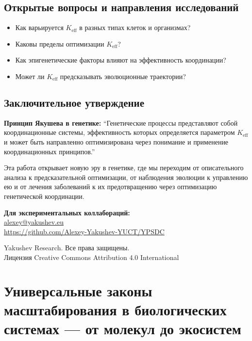 \documentclass[12pt]{article}
\begin{document}
	\subsection{Открытые вопросы и направления исследований}
	
	\begin{itemize}
		\item Как варьируется $K_{\text{eff}}$ в разных типах клеток и организмах?
		\item Каковы пределы оптимизации $K_{\text{eff}}$?
		\item Как эпигенетические факторы влияют на эффективность координации?
		\item Может ли $K_{\text{eff}}$ предсказывать эволюционные траектории?
	\end{itemize}
	
	\subsection{Заключительное утверждение}
	
	\textbf{Принцип Якушева в генетике:}
	``Генетические процессы представляют собой координационные системы, эффективность которых определяется параметром $K_{\text{eff}}$ и может быть направленно оптимизирована через понимание и применение координационных принципов.''
	
	Эта работа открывает новую эру в генетике, где мы переходим от описательного анализа к предсказательной оптимизации, от наблюдения эволюции к управлению ею и от лечения заболеваний к их предотвращению через оптимизацию генетической координации.
	
	\begin{center}
		\vspace{1cm}
		\textbf{Для экспериментальных коллабораций:}\\
		\url{alexey@yakushev.eu}\\
		\url{https://github.com/Alexey-Yakushev-YUCT/YPSDC}
		
		\vspace{0.5cm}
		 Yakushev Research. Все права защищены.\\
		Лицензия Creative Commons Attribution 4.0 International
	\end{center}
	
	\section{Универсальные законы масштабирования в биологических системах — от молекул до экосистем}
	\label{sec:bio-scaling}
	
\end{document}
